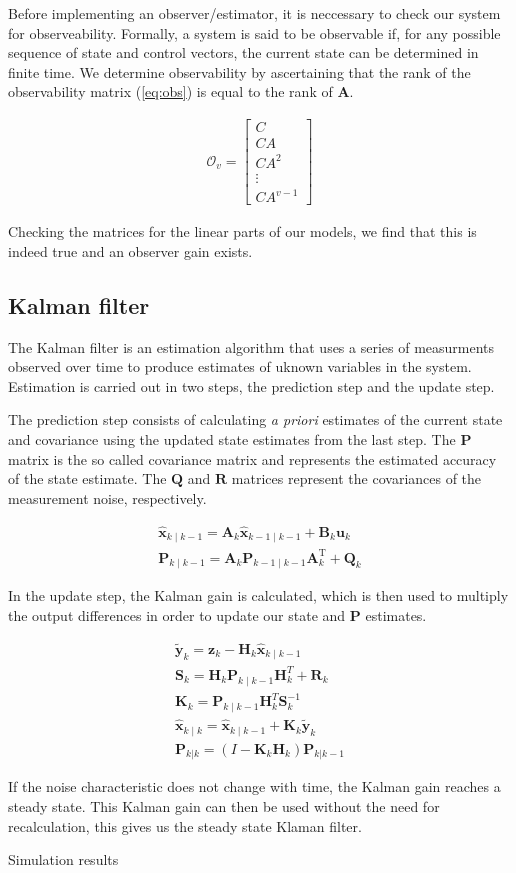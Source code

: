 Before implementing an observer/estimator, it is neccessary to check our system for observeability.
Formally, a system is said to be observable if, for any possible sequence of state and control vectors, the current state can be determined in finite time.
We determine observability by ascertaining that the rank of the observability matrix (\ref{eq:obs}) is equal to the rank of $\mathbf{A}$. 

\begin{align}\label{eq:obs}
\mathcal{O}_v=\begin{bmatrix} C \\ CA \\ CA^2 \\ \vdots \\ CA^{v-1} \end{bmatrix}
\end{align}

Checking the matrices for the linear parts of our models, we find that this is indeed true and an observer gain exists.

\subsection{Kalman filter}
The Kalman filter is an estimation algorithm that uses a series of measurments observed over time to produce estimates of uknown variables in the system.
Estimation is carried out in two steps, the prediction step and the update step.

The prediction step consists of calculating \textit{a priori} estimates of the current state and covariance using the updated state estimates from the last step. 
The $\mathbf{P}$ matrix is the so called covariance matrix and represents the estimated accuracy of the state estimate.
The $\mathbf{Q}$ and $\mathbf{R}$ matrices represent the covariances of the measurement noise, respectively.

\begin{gather}
\hat{\mathbf{x}}_{k\mid k-1} = \mathbf{A}_{k}\hat{\mathbf{x}}_{k-1\mid k-1} + \mathbf{B}_{k} \mathbf{u}_{k} \\
\mathbf{P}_{k\mid k-1} =  \mathbf{A}_{k} \mathbf{P}_{k-1\mid k-1} \mathbf{A}_{k}^{\text{T}} + \mathbf{Q}_{k} 
\end{gather}

In the update step, the Kalman gain is calculated, which is then used to multiply the output differences in order to update our state and $\mathbf{P}$  estimates.

\begin{gather}
\tilde{\mathbf{y}}_k = \mathbf{z}_k - \mathbf{H}_k\hat{\mathbf{x}}_{k\mid k-1}\\
\mathbf{S}_k = \mathbf{H}_k \mathbf{P}_{k\mid k-1} \mathbf{H}_k^T + \mathbf{R}_k\\
\mathbf{K}_k = \mathbf{P}_{k\mid k-1}\mathbf{H}_k^T \mathbf{S}_k^{-1}\\
\hat{\mathbf{x}}_{k\mid k} = \hat{\mathbf{x}}_{k\mid k-1} + \mathbf{K}_k\tilde{\mathbf{y}}_k \\
\mathbf{P}_{k|k} = (I - \mathbf{K}_k \mathbf{H}_k) \mathbf{P}_{k|k-1} 
\end{gather}

If the noise characteristic does not change with time, the Kalman gain reaches a steady state.
This Kalman gain can then be used without the need for recalculation, this gives us the steady state Klaman filter.

Simulation results 



